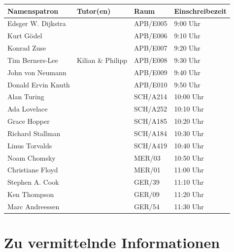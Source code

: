 \documentclass[a4paper,12pt]{report}
\begin{document}
\begin{center}
\vspace{1cm}
\begin{tabular}[h]{|l|l|l|l|}
	\hline
	\textbf{Namenspatron} & \textbf{Tutor(en)} & \textbf{Raum}& \textbf{Einschreibezeit}\\ \hline
	Edsger W. Dijkstra & & APB/E005 & 9:00 Uhr\\
	Kurt Gödel & & APB/E006 & 9:10 Uhr\\
	Konrad Zuse & & APB/E007 & 9:20 Uhr\\
	Tim Berners-Lee & Kilian \& Philipp & APB/E008 & 9:30 Uhr\\
	John von Neumann & & APB/E009 & 9:40 Uhr\\
	Donald Ervin Knuth & & APB/E010 & 9:50 Uhr\\
	Alan Turing & & SCH/A214 & 10:00 Uhr\\
	Ada Lovelace & & SCH/A252 & 10:10 Uhr\\
	Grace Hopper & & SCH/A185 & 10:20 Uhr\\
	Richard Stallman & & SCH/A184 & 10:30 Uhr\\
	Linus Torvalds & & SCH/A419 & 10:40 Uhr\\
	Noam Chomsky & & MER/03 & 10:50 Uhr\\
	Christiane Floyd & & MER/01 & 11:00 Uhr\\
	Stephen A. Cook & & GER/39 & 11:10 Uhr\\
	Ken Thompson & & GER/09 & 11:20 Uhr\\
	Marc Andreessen & & GER/54 & 11:30 Uhr\\
	\hline
\end{tabular}
\end{center}

\chapter{Zu vermittelnde Informationen}
\end{document}
